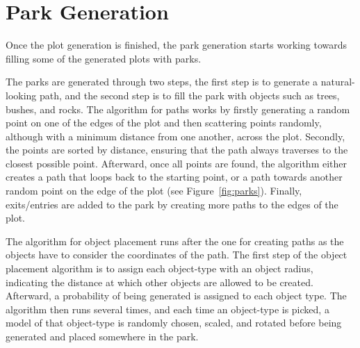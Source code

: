 \section{Park Generation}

Once the plot generation is finished, the park generation starts working towards filling some of the generated plots with parks.

The parks are generated through two steps, the first step is to generate a natural-looking path, and the second step is to fill the park with objects such as trees, bushes, and rocks. 
The algorithm for paths works by firstly generating a random point on one of the edges of the plot and then scattering points randomly, although with a minimum distance from one another, across the plot. 
Secondly, the points are sorted by distance, ensuring that the path always traverses to the closest possible point. 
Afterward, once all points are found, the algorithm either creates a path that loops back to the starting point, or a path towards another random point on the edge of the plot (see Figure~\ref{fig:parks}).
Finally, exits/entries are added to the park by creating more paths to the edges of the plot.  

The algorithm for object placement runs after the one for creating paths as the objects have to consider the coordinates of the path.
The first step of the object placement algorithm is to assign each object-type with an object radius, indicating the distance at which other objects are allowed to be created. 
Afterward, a probability of being generated is assigned to each object type.
The algorithm then runs several times, and each time an object-type is picked, a model of that object-type is randomly chosen, scaled, and rotated before being generated and placed somewhere in the park.

